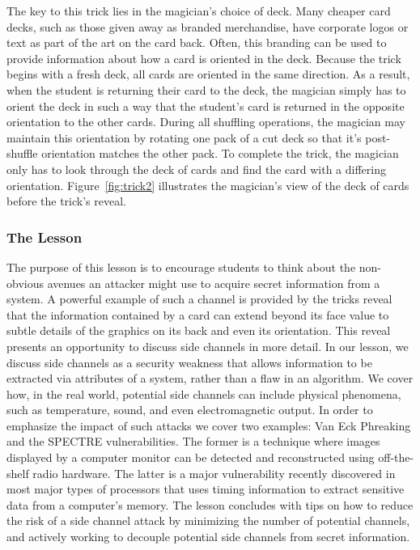 The key to this trick lies in the magician's choice of deck.  Many cheaper card
decks, such as those given away as branded merchandise,
have corporate logos or
text as part of the art on the card back.  Often, this branding can be used to
provide information about how a card is oriented in the deck.  Because the trick
begins with a fresh deck, all cards are oriented in the same direction.  As a
result, when the student is returning their card to the deck, the magician
simply has to orient the deck in such a way that the student's card is returned
in the opposite orientation to the other cards.  During all shuffling
operations, the magician may maintain this orientation by rotating one pack of a
cut deck so that it's post-shuffle orientation matches the other pack.
To complete the trick, the magician only has to look through the deck of cards
and find the card with a differing orientation.  Figure~\ref{fig:trick2}
illustrates the magician's view of the deck of cards before the trick's
reveal.

%

\subsubsection{The Lesson}

The purpose of this lesson is to encourage students to think about the
non-obvious avenues an attacker might use to acquire secret information from a
system.  A powerful example of such a channel is provided by the tricks reveal
that the information contained by a card can extend beyond its face value to
subtle details of the graphics on its back and even its orientation.  This
reveal
presents an opportunity to discuss side channels in more detail.
In our lesson, we discuss side channels as
a security weakness that allows information to be extracted via attributes
of a system, rather than a flaw in an
algorithm.
We cover how, in the real world,
potential side channels can include
physical phenomena,
such as
temperature,
sound,
and even electromagnetic output.
In order to emphasize the impact of such attacks we cover two examples: Van
Eck Phreaking and the SPECTRE vulnerabilities.
The former is a technique where images displayed by a computer monitor can be
detected and reconstructed using off-the-shelf radio hardware.
The latter is a major vulnerability recently discovered in most major types of
processors that uses timing information to extract sensitive data from a
computer's memory.
The lesson concludes with tips on how to
reduce the risk of a side channel attack
by minimizing the number of potential channels,
and actively working to decouple potential
side channels from secret information.

